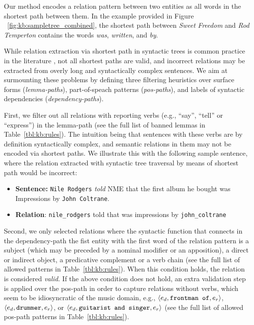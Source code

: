 Our method encodes a relation pattern between two entities as all words in the shortest path between them. In the example provided in Figure ~\ref{fig:kb:sampletree_combined}, the shortest path between \emph{Sweet Freedom} and \emph{Rod Temperton} contains the words \textit{was}, \textit{written}, and \textit{by}.

While relation extraction via shortest path in syntactic trees is common practice in the literature \citep{DelliBovietal2015b,MoroandNavigli2012,Nakasholeetal2012}, not all shortest paths are valid, and incorrect relations may be extracted from overly long and syntactically complex sentences. We aim at surmounting these problems by defining three filtering heuristics over surface forms (\textit{lemma-paths}), part-of-speach patterns (\textit{pos-paths}), and labels of syntactic dependencies (\textit{dependency-paths}).

First, we filter out all relations with reporting verbs (e.g., ``say'', ``tell'' or ``express'') in the lemma-path (see the full list of banned lemmas in Table~\ref{tbl:kb:rules}). The intuition being that sentences with these verbs are by definition syntactically complex, and semantic relations in them may not be encoded via shortest paths. We illustrate this with the following sample sentence, where the relation extracted with syntactic tree traversal by means of shortest path would be incorrect:

\begin{itemize}
\item[] \textbf{Sentence:} \texttt{Nile Rodgers} \textit{told} NME that the first album he bought was Impressions by \texttt{John Coltrane}.
\item[] \textbf{Relation}: \texttt{nile\_rodgers} told that was impressions by \texttt{john\_coltrane}
\end{itemize}

Second, we only selected relations where the syntactic function that connects in the dependency-path the fist entity with the first word of the relation pattern is a subject (which may be preceded by a nominal modifier or an apposition), a direct or indirect object, a predicative complement or a verb chain (see the full list of allowed patterns in Table~\ref{tbl:kb:rules}). When this condition holds, the relation is considered \textit{valid}. If the above condition does not hold, an extra validation step is applied over the pos-path in order to capture relations without verbs, which seem to be idiosyncratic of the music domain, e.g., $\langle e_d, \mbox{\texttt{frontman of}}, e_r \rangle$, $\langle e_d, \mbox{\texttt{drummer}}, e_r \rangle$, or $\langle e_d, \mbox{\texttt{guitarist and singer}}, e_r \rangle$ (see the full list of allowed pos-path patterns in Table~\ref{tbl:kb:rules}).

